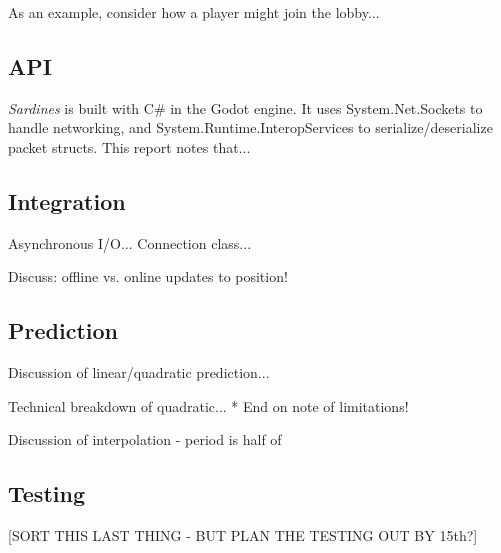 \documentclass[a4paper, 11pt]{article}
\begin{document}
\begin{flushleft}
\vspace{5pt}\noindent
As an example, consider how a player might join the lobby...

\subsection*{API}

\textit{Sardines} is built with C\# in the Godot engine. It uses System.Net.Sockets to handle networking, and System.Runtime.InteropServices to serialize/deserialize packet structs. This report notes that...



\subsection*{Integration}

Asynchronous I/O...
Connection class...

\vspace{5pt}\noindent
Discuss: offline vs. online updates to position!

\subsection*{Prediction}

Discussion of linear/quadratic prediction...


\vspace{5pt}\noindent
Technical breakdown of quadratic...
* End on note of limitations!

\vspace{5pt}\noindent
Discussion of interpolation - period is half of


\vspace{5pt}

\subsection*{Testing}

[SORT THIS LAST THING - BUT PLAN THE TESTING OUT BY 15th?]

%
%
\end{flushleft}
\end{document}
